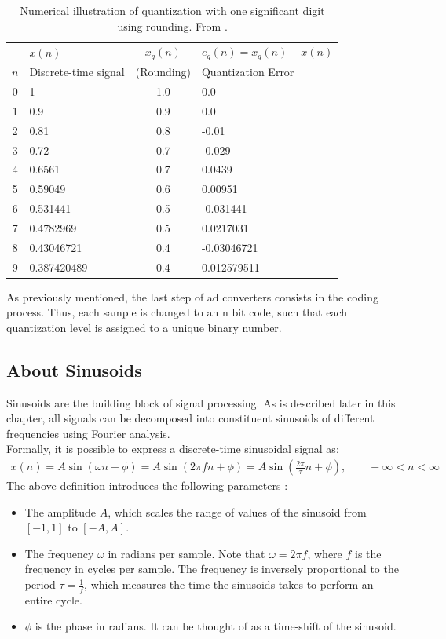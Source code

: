 \begin{table}[]
	\begin{center}
		\begin{tabular}{clcl}
			\hline & $x(n)$ & $x_{q}(n)$ & $e_{q}(n)=x_{q}(n)-x(n)$ \\
			$n$ & Discrete-time signal & (Rounding) & Quantization Error \\
			\hline 0 & 1 & 1.0 & 0.0 \\
			1 & 0.9 & 0.9 & 0.0 \\
			2 & 0.81 & 0.8 & -0.01 \\
			3 & 0.72 & 0.7 & -0.029 \\
			4 & 0.6561 & 0.7 & 0.0439 \\
			5 & 0.59049 & 0.6 & 0.00951 \\
			6 & 0.531441 & 0.5 & -0.031441 \\
			7 & 0.4782969 & 0.5 & 0.0217031 \\
			8 & 0.43046721 & 0.4 & -0.03046721 \\
			9 & 0.387420489 & 0.4 & 0.012579511 \\
			\hline
		\end{tabular}
		\caption{Numerical illustration of quantization with one significant digit using rounding. From \cite{proakis2006dimitris}.}
		\label{tab:quant}
	\end{center}
\end{table}

\noindent As previously mentioned, the last step of \gls{ad} converters consists in the coding process. Thus, each sample is changed to an n bit code, such that each quantization level is assigned to a unique binary number.

\subsection{About Sinusoids}
Sinusoids are the building block of signal processing. As is described later in this chapter, all signals can be decomposed into constituent sinusoids of different frequencies using Fourier analysis. \\
Formally, it is possible to express a discrete-time sinusoidal signal as:
\begin{align} \label{eq:sinusoidal_signal}
	x(n) = A \sin(\omega n + \phi) = A \sin(2\pi fn + \phi) = A \sin(\frac{2\pi}{\tau}n + \phi), \qquad -\infty < n < \infty
\end{align}
\noindent The above definition introduces the following parameters \cite{christensen2019sound}:
\begin{itemize}
	\item The amplitude $A$, which scales the range of values of the sinusoid from  $[{-1},1]$ to  $[{-A},A]$.
	\item The frequency $\omega$ in radians per sample. Note that $\omega = 2 \pi f$, where $f$ is the frequency in cycles per sample. The frequency is inversely proportional to the period $\tau = \frac{1}{f}$, which measures the time the sinusoids takes to perform an entire cycle. 
	\item $\phi$ is the phase in radians. It can be thought of as a time-shift of the sinusoid.
\end{itemize}

